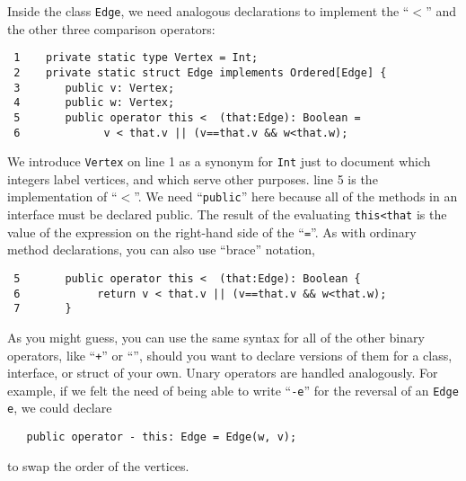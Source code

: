Inside the class {\tt Edge}, we need analogous declarations to implement the
``$<$'' and the other three comparison operators:
\begin{verbatim}
 1    private static type Vertex = Int;
 2    private static struct Edge implements Ordered[Edge] {
 3       public v: Vertex; 
 4       public w: Vertex;
 5       public operator this <  (that:Edge): Boolean =
 6             v < that.v || (v==that.v && w<that.w);
\end{verbatim}
We introduce {\tt Vertex} on line 1 as a synonym for {\tt Int} just to document
which integers label vertices, and which serve other purposes.  line 5 is the
implementation of ``$<$''.  We need ``{\tt public}'' here because all of the
methods in an interface must be declared public.  The result of the evaluating
{\tt this<that} is the value of the expression on the right-hand side of the
``{\tt =}''.  As with ordinary method declarations, you can also use ``brace''
notation,
\begin{verbatim}
 5       public operator this <  (that:Edge): Boolean {
 6            return v < that.v || (v==that.v && w<that.w);
 7       }
\end{verbatim}
 
As you might guess, you can use the same syntax for all of the other binary
operators, like ``{\tt +}'' or ``{\tt *}'', should you want to declare versions
of them for a class, interface, or struct of your own. Unary operators are
handled analogously. For example, if we felt the need of being able to write
``{\tt -e}'' for the reversal of an {\tt Edge} {\tt e}, we could declare
\begin{verbatim}
   public operator - this: Edge = Edge(w, v);
\end{verbatim}
to swap the order of the vertices.

